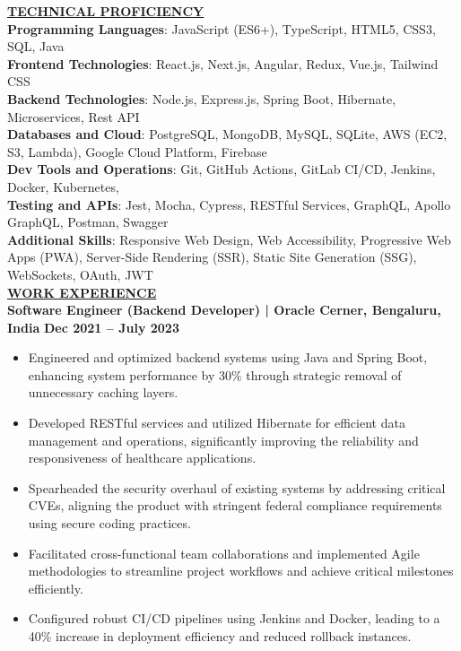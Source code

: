 \documentclass{article}
\begin{document}
\noindent \textbf{\underline{TECHNICAL PROFICIENCY}} \\
\textbf{Programming Languages}{: \small JavaScript (ES6+), TypeScript, HTML5, CSS3, SQL, Java} \\
\textbf{Frontend Technologies}{: \small React.js, Next.js, Angular, Redux, Vue.js, Tailwind CSS} \\
\textbf{Backend Technologies}{: \small Node.js, Express.js, Spring Boot, Hibernate, Microservices, Rest API} \\
\textbf{Databases and Cloud}{: \small PostgreSQL, MongoDB, MySQL, SQLite, AWS (EC2, S3, Lambda), Google Cloud Platform, Firebase} \\
\textbf{Dev Tools and Operations}{: \small Git, GitHub Actions, GitLab CI/CD, Jenkins, Docker, Kubernetes,} \\
\textbf{Testing and APIs}{: \small Jest, Mocha, Cypress, RESTful Services, GraphQL, Apollo GraphQL, Postman, Swagger} \\
\textbf{Additional Skills}{: \small Responsive Web Design, Web Accessibility, Progressive Web Apps (PWA), Server-Side Rendering (SSR), Static Site Generation (SSG), WebSockets, OAuth, JWT} \\




\noindent \textbf{\underline{WORK EXPERIENCE}} \\
\noindent \textbf{Software Engineer (Backend Developer) | Oracle Cerner, Bengaluru, India}  \hfill \textbf{Dec 2021 – July 2023}
\begin{itemize}[noitemsep,nolistsep,leftmargin=*]
\item {\small Engineered and optimized backend systems using Java and Spring Boot, enhancing system performance by 30\% through strategic removal of unnecessary caching layers.}
\item {\small Developed RESTful services and utilized Hibernate for efficient data management and operations, significantly improving the reliability and responsiveness of healthcare applications.}
\item {\small Spearheaded the security overhaul of existing systems by addressing critical CVEs, aligning the product with stringent federal compliance requirements using secure coding practices.}
\item {\small Facilitated cross-functional team collaborations and implemented Agile methodologies to streamline project workflows and achieve critical milestones efficiently.}
\item {\small Configured robust CI/CD pipelines using Jenkins and Docker, leading to a 40\% increase in deployment efficiency and reduced rollback instances.}\\
\end{itemize}
\end{document}
